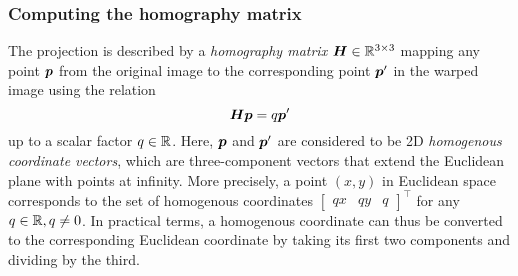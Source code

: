 \documentclass[../report.tex]{subfiles}
\begin{document}
\subsubsection{Computing the homography matrix}
\label{sec:homography_matrix}
The projection is described by a \emph{homography matrix} ${\bm{H}} \in \mathbb{R}^{3 \times 3}$ \cite{szeliski2011} mapping any point
${\bm{p}}$
from the original image to
the corresponding point
${\bm{p}}'$
in the warped image using the relation
\begin{equation}
    \label{eq:homography_matrix_relation}
    {\bm{H}}
    {\bm{p}}
    = q {\bm{p}}'
\end{equation}
up to a scalar factor $q \in \mathbb{R}$.
Here, ${\bm{p}}$ and ${\bm{p}}'$ are considered to be 2D \emph{homogenous coordinate vectors}, which are three-component vectors that extend the Euclidean plane with points at infinity. 
More precisely, a point $(x,y)$ in Euclidean space corresponds to the set of homogenous coordinates
$\begin{bmatrix}
    q x & q y & q
\end{bmatrix}^\top$ for any $q \in \mathbb{R},q \neq 0$.
In practical terms, a homogenous coordinate can thus be converted to the corresponding Euclidean coordinate by taking its first two components and dividing by the third.
\end{document}
